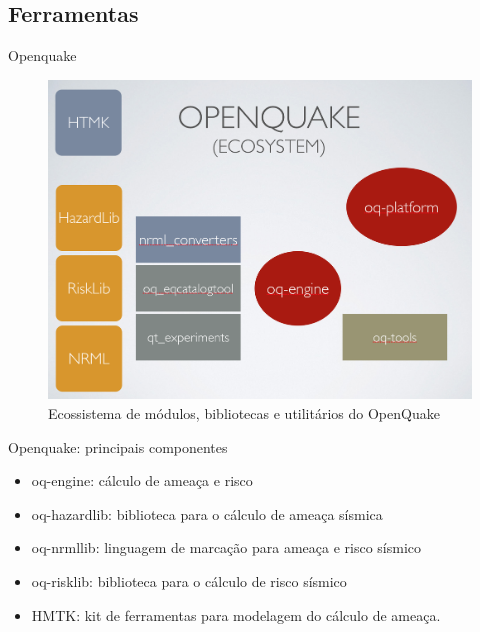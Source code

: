 \documentclass[ucs,8pt]{beamer}
\begin{document}
\subsection{Ferramentas}
\begin{frame}{Openquake}
\begin{figure}[!h]
  \centering
  \includegraphics[height=.90\textheight]{oq_ecosystem} 
  \caption{Ecossistema de módulos, bibliotecas e utilitários do OpenQuake}
  \label{fig:oq} 
\end{figure}
\end{frame}


\begin{frame}{Openquake: principais componentes}
\begin{itemize}
  \item oq-engine: cálculo de ameaça e risco
  \item oq-hazardlib: biblioteca para o cálculo de ameaça sísmica
  \item oq-nrmllib: linguagem de marcação para ameaça e risco sísmico
  \item oq-risklib: biblioteca para o cálculo de risco sísmico
  \item HMTK: kit de ferramentas para modelagem do cálculo de ameaça.
\end{itemize}
\end{frame}
\end{document}
